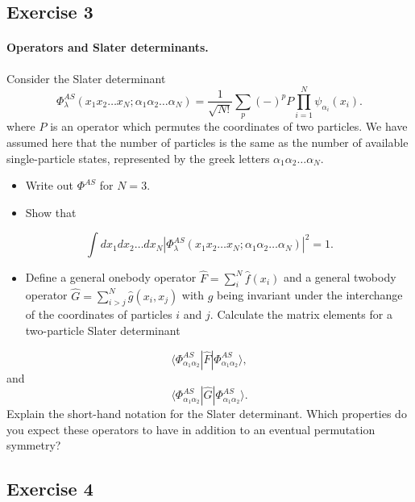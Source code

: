 \documentclass[%
twoside,                 %
final,                   %
10pt]{article}
\begin{document}
\noindent



\subsection*{Exercise 3}

\paragraph{Operators and Slater determinants.}
Consider the Slater determinant
\[
\Phi_{\lambda}^{AS}(x_{1}x_{2}\dots x_{N};\alpha_{1}\alpha_{2}\dots\alpha_{N})
=\frac{1}{\sqrt{N!}}\sum_{p}(-)^{p}P\prod_{i=1}^{N}\psi_{\alpha_{i}}(x_{i}).
\]
where $P$ is an operator which permutes the coordinates of two particles. We have assumed here that the 
number of particles is the same as the number of available single-particle states, represented by the
greek letters $\alpha_{1}\alpha_{2}\dots\alpha_{N}$.
\begin{itemize}
 \item Write  out $\Phi^{AS}$ for $N=3$.  

 \item Show that
\end{itemize}

\noindent
\[
\int dx_{1}dx_{2}\dots dx_{N}\left\vert
\Phi_{\lambda}^{AS}(x_{1}x_{2}\dots x_{N};\alpha_{1}\alpha_{2}\dots\alpha_{N})
\right\vert^{2} = 1.
\]
\begin{itemize}
 \item Define a general onebody operator $\hat{F} = \sum_{i}^N\hat{f}(x_{i})$ and a general  twobody operator $\hat{G}=\sum_{i>j}^N\hat{g}(x_{i},x_{j})$ with $g$ being invariant under the interchange of the coordinates of particles $i$ and $j$. Calculate the matrix elements for a two-particle Slater determinant
\end{itemize}

\noindent
\[
\langle\Phi_{\alpha_{1}\alpha_{2}}^{AS}|\hat{F}|\Phi_{\alpha_{1}\alpha_{2}}^{AS}\rangle,
\]
and
\[
\langle\Phi_{\alpha_{1}\alpha_{2}}^{AS}|\hat{G}|\Phi_{\alpha_{1}\alpha_{2}}^{AS}\rangle.
\]
Explain the short-hand notation for the Slater determinant.
Which properties do you expect these operators to have in addition to an eventual permutation
symmetry?



\subsection*{Exercise 4}
\end{document}
